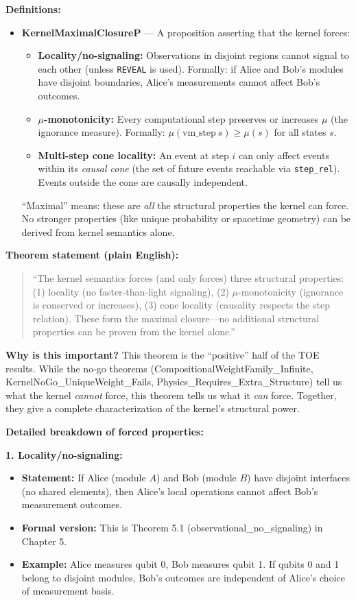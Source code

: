 \textbf{Definitions:}
\begin{itemize}
    \item \textbf{KernelMaximalClosureP} — A proposition asserting that the kernel forces:
    \begin{itemize}
        \item \textbf{Locality/no-signaling:} Observations in disjoint regions cannot signal to each other (unless \texttt{REVEAL} is used). Formally: if Alice and Bob's modules have disjoint boundaries, Alice's measurements cannot affect Bob's outcomes.
        \item \textbf{$\mu$-monotonicity:} Every computational step preserves or increases $\mu$ (the ignorance measure). Formally: $\mu(\text{vm\_step}\ s) \geq \mu(s)$ for all states $s$.
        \item \textbf{Multi-step cone locality:} An event at step $i$ can only affect events within its \textit{causal cone} (the set of future events reachable via \texttt{step\_rel}). Events outside the cone are causally independent.
    \end{itemize}
    ``Maximal'' means: these are \textit{all} the structural properties the kernel can force. No stronger properties (like unique probability or spacetime geometry) can be derived from kernel semantics alone.
\end{itemize}

\textbf{Theorem statement (plain English):}
\begin{quote}
``The kernel semantics forces (and only forces) three structural properties: (1) locality (no faster-than-light signaling), (2) $\mu$-monotonicity (ignorance is conserved or increases), (3) cone locality (causality respects the step relation). These form the maximal closure---no additional structural properties can be proven from the kernel alone.''
\end{quote}

\textbf{Why is this important?} This theorem is the ``positive'' half of the TOE results. While the no-go theorems (CompositionalWeightFamily\_Infinite, KernelNoGo\_UniqueWeight\_Fails, Physics\_Requires\_Extra\_Structure) tell us what the kernel \textit{cannot} force, this theorem tells us what it \textit{can} force. Together, they give a complete characterization of the kernel's structural power.

\textbf{Detailed breakdown of forced properties:}

\textbf{1. Locality/no-signaling:}
\begin{itemize}
    \item \textbf{Statement:} If Alice (module $A$) and Bob (module $B$) have disjoint interfaces (no shared elements), then Alice's local operations cannot affect Bob's measurement outcomes.
    \item \textbf{Formal version:} This is Theorem 5.1 (observational\_no\_signaling) in Chapter 5.
    \item \textbf{Example:} Alice measures qubit 0, Bob measures qubit 1. If qubits 0 and 1 belong to disjoint modules, Bob's outcomes are independent of Alice's choice of measurement basis.
\end{itemize}

